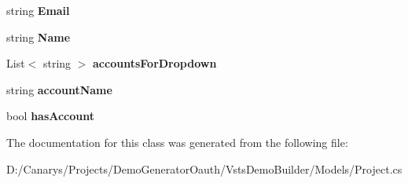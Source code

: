 \begin{DoxyCompactItemize}
string {\bfseries Email}
\item 
\mbox{\label{class_vsts_demo_builder_1_1_models_1_1_project_a405df8a6ec98ef5eb5d4a367da3816a3}} 
string {\bfseries Name}
\item 
\mbox{\label{class_vsts_demo_builder_1_1_models_1_1_project_af663447ab93ef1567f9e2a0cc94479cc}} 
List$<$ string $>$ {\bfseries accounts\+For\+Dropdown}
\item 
\mbox{\label{class_vsts_demo_builder_1_1_models_1_1_project_a90ad284d1e3a22bd64b5fbcda755db72}} 
string {\bfseries account\+Name}
\item 
\mbox{\label{class_vsts_demo_builder_1_1_models_1_1_project_a326a1449d44e4c8c56d3b36bf6a61343}} 
bool {\bfseries has\+Account}
\end{DoxyCompactItemize}


The documentation for this class was generated from the following file\+:\begin{DoxyCompactItemize}
\item 
D\+:/\+Canarys/\+Projects/\+Demo\+Generator\+Oauth/\+Vsts\+Demo\+Builder/\+Models/Project.\+cs\end{DoxyCompactItemize}
